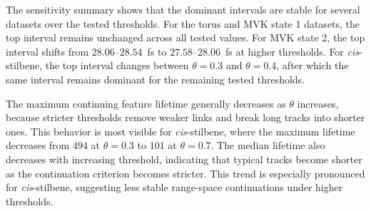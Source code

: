 \documentclass[review]{vgtc}
\begin{document}
The sensitivity summary shows that the dominant intervals are stable for several datasets over the tested thresholds. For the torus and MVK state 1 datasets, the top interval remains unchanged across all tested values. For MVK state 2, the top interval shifts from $28.06$--$28.54$~fs to $27.58$--$28.06$~fs at higher thresholds. For \textit{cis}-stilbene, the top interval changes between $\theta=0.3$ and $\theta=0.4$, after which the same interval remains dominant for the remaining tested thresholds.

The maximum continuing feature lifetime generally decreases as $\theta$ increases, because stricter thresholds remove weaker links and break long tracks into shorter ones. This behavior is most visible for \textit{cis}-stilbene, where the maximum lifetime decreases from $494$ at $\theta=0.3$ to $101$ at $\theta=0.7$. The median lifetime also decreases with increasing threshold, indicating that typical tracks become shorter as the continuation criterion becomes stricter. This trend is especially pronounced for \textit{cis}-stilbene, suggesting less stable range-space continuations under higher thresholds.
\end{document}
